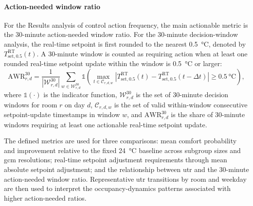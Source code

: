 \paragraph{Action-needed window ratio}
For the Results analysis of control action frequency, the main actionable metric is the 30-minute action-needed window ratio.
For the 30-minute decision-window analysis, the real-time setpoint is first rounded to the nearest \qty{0.5}{\celsius}, denoted by $T_{\mathrm{set},0.5}^{\mathrm{RT}}(t)$.
A 30-minute window is counted as requiring action when at least one rounded real-time setpoint update within the window is \qty{0.5}{\celsius} or larger:
\begin{equation}
\mathrm{AWR}_{r,d}^{30}
=
\frac{1}{|\mathcal{W}_{r,d}^{30}|}
\sum_{w\in\mathcal{W}_{r,d}^{30}}
\mathbb{1}
\left(
\max_{t\in\mathcal{C}_{r,d,w}}
\left|
T_{\mathrm{set},0.5}^{\mathrm{RT}}(t)
-
T_{\mathrm{set},0.5}^{\mathrm{RT}}(t-\Delta t)
\right|
\geq \qty{0.5}{\celsius}
\right),
\label{eq:action_needed_window_ratio}
\end{equation}
where $\mathbb{1}(\cdot)$ is the indicator function, $\mathcal{W}_{r,d}^{30}$ is the set of 30-minute decision windows for room $r$ on day $d$, $\mathcal{C}_{r,d,w}$ is the set of valid within-window consecutive setpoint-update timestamps in window $w$, and $\mathrm{AWR}_{r,d}^{30}$ is the share of 30-minute windows requiring at least one actionable real-time setpoint update.

The defined metrics are used for three comparisons: mean comfort probability and improvement relative to the fixed \qty{24}{\celsius} baseline across subgroup sizes and \ac{gcm} resolutions; real-time setpoint adjustment requirements through mean absolute setpoint adjustment; and the relationship between \ac{utr} and the 30-minute action-needed window ratio.
Representative \ac{utr} transitions by room and weekday are then used to interpret the occupancy-dynamics patterns associated with higher action-needed ratios.




